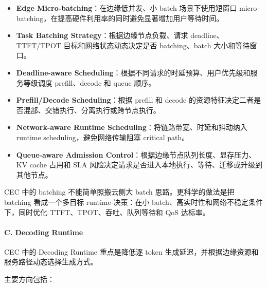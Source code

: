 \documentclass[a4paper,10pt]{ctexart}
\begin{document}
\begin{itemize}
\item \textbf{Edge Micro-batching}：在边缘低并发、小 batch 场景下使用短窗口 micro-batching，在提高硬件利用率的同时避免显著增加用户等待时间。

\item \textbf{Task Batching Strategy}：根据边缘节点负载、请求 deadline、TTFT/TPOT 目标和网络状态动态决定是否 batching、batch 大小和等待窗口。

\item \textbf{Deadline-aware Scheduling}：根据不同请求的时延预算、用户优先级和服务等级调度 prefill、decode 和 queue 顺序。

\item \textbf{Prefill/Decode Scheduling}：根据 prefill 和 decode 的资源特征决定二者是否混部、交错执行、分离执行或跨节点执行。

\item \textbf{Network-aware Runtime Scheduling}：将链路带宽、时延和抖动纳入 runtime scheduling，避免网络传输阻塞 critical path。

\item \textbf{Queue-aware Admission Control}：根据边缘节点队列长度、显存压力、KV cache 占用和 SLA 风险决定请求是否进入本地执行、等待、迁移或升级到其他节点。



\end{itemize}
CEC 中的 batching 不能简单照搬云侧大 batch 思路。更科学的做法是把 batching 看成一个多目标 runtime 决策：在小 batch、高实时性和网络不稳定条件下，同时优化 TTFT、TPOT、吞吐、队列等待和 QoS 达标率。




\paragraph*{C. Decoding Runtime}



CEC 中的 Decoding Runtime 重点是降低逐 token 生成延迟，并根据边缘资源和服务路径动态选择生成方式。




主要方向包括：
\end{document}
